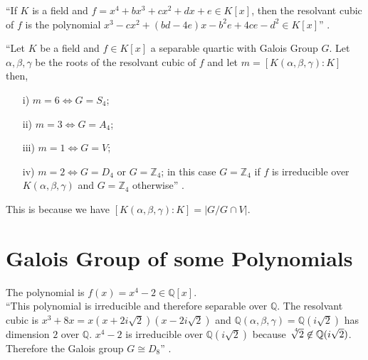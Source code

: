 \begin{remark} ``If \(K\) is a field and \(f = x^4+bx^3+cx^2+dx+e \in K[x]\), then the resolvant cubic of \(f\) is the polynomial \(x^3-cx^2+(bd-4e)x-b^2e+4ce-d^2 \in K[x]\)'' \cite{hunger}.\\[2mm]
\end{remark}

\begin{tcolorbox}
\begin{theorem}
  ``Let \(K\) be a field and \(f \in K[x]\) a separable quartic with Galois Group \(G\). Let \(\alpha, \beta, \gamma\) be the roots of the resolvant cubic of \(f\) and let \(m= [K(\alpha, \beta, \gamma) : K]\) then,
\begin{enumerate}
\item[i)] \(m=6 \Longleftrightarrow G=S_4\);
\item[ii)] \(m=3 \Longleftrightarrow G=A_4\);
\item[iii)] \(m=1 \Longleftrightarrow G=V\);
\item[iv)] \(m=2 \Longleftrightarrow G=D_4\) or \(G={\mathbb{Z}}_4\); in this case \(G={\mathbb{Z}}_4\) if \(f\) is irreducible over \(K(\alpha, \beta, \gamma)\) and \(G={\mathbb{Z}}_4\) otherwise'' \cite{hunger}.
\end{enumerate}
\end{theorem}
\end{tcolorbox}

This is because we have \([K(\alpha,\beta,\gamma):K] = |G/G \cap V|\).

\section{Galois Group of some Polynomials}

\begin{example}
The polynomial is \(f(x)=x^4-2 \in \mathbb{Q}[x]\).\\
``This polynomial is irreducible and therefore separable over \(\mathbb{Q}\). The resolvant cubic is \(x^3+8x = x(x+2i\sqrt{2})(x-2i\sqrt{2})\) and
\(\mathbb{Q}(\alpha,\beta, \gamma)=\mathbb{Q}(i\sqrt{2})\) has dimension \(2\) over \(\mathbb{Q}\). \(x^4-2\) is irreducible over \(\mathbb{Q}(i\sqrt{2})\) because \(\sqrt[\leftroot{-3}\uproot{3}4]{2} \not\in \mathbb{Q}(i\sqrt{2})\).
Therefore the Galois group \(G \cong D_8\)'' \cite{hunger}.
\end{example}

